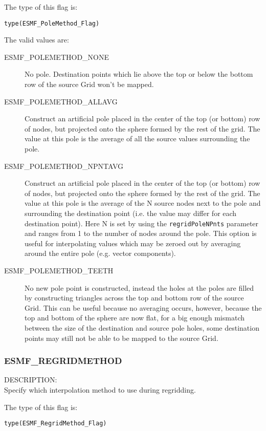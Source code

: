 The type of this flag is:

{\tt type(ESMF\_PoleMethod\_Flag)}

The valid values are:
\begin{description}
\item [ESMF\_POLEMETHOD\_NONE]
      No pole. Destination points which lie above the top or below the bottom row of the source Grid won't be mapped. 
\item [ESMF\_POLEMETHOD\_ALLAVG]
      Construct an artificial pole placed in the center of the top (or bottom) row of nodes, but projected onto the sphere formed by the rest of the grid. The value at this pole is the average of all the source values surrounding the pole.
\item [ESMF\_POLEMETHOD\_NPNTAVG] Construct an artificial pole placed in the center of the top (or bottom) row of nodes, but projected onto the sphere formed by the rest of the grid. The value at this pole is the average of the N source nodes next to the pole and surrounding the destination point (i.e. the value may differ for each destination point). Here N is set by using the {\tt regridPoleNPnts} parameter and ranges from 1 to the number of nodes around the pole. This option is useful for interpolating values which may be zeroed out by averaging around the entire pole (e.g. vector components). 
\item [ESMF\_POLEMETHOD\_TEETH]
    No new pole point is constructed, instead the holes at the poles are filled by constructing triangles across the top and bottom row of the source Grid. This can be useful because no averaging occurs, however, because the top and bottom of the sphere are now flat, for a big enough mismatch between the size of the destination and source pole holes, some destination points may still not be able to be mapped to the source Grid. 
\end{description}

\subsubsection{ESMF\_REGRIDMETHOD}
\label{opt:regridmethod}

{\sf DESCRIPTION:\\}  
Specify which interpolation method to use during regridding. 

The type of this flag is:

{\tt type(ESMF\_RegridMethod\_Flag)}

